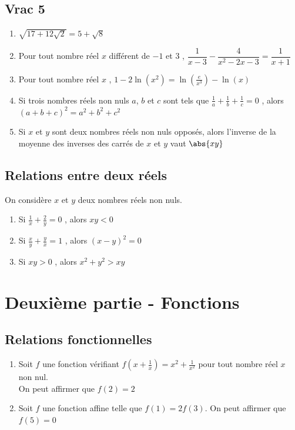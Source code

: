 \documentclass[oneside,12pt]{article}
\begin{document}
\subsection{Vrac 5}
\begin{enumerate}
	\item $\sqrt{17+12\sqrt{2}}=5+\sqrt{8}$
	\item Pour tout nombre réel $x$ différent de $-1$ et $3$ , $\dfrac{1}{x-3}-\dfrac{4}{x^2-2x-3}=\dfrac{1}{x+1}$
	\item Pour tout nombre réel $x$ , $1-2\ln(x^2)=\ln\left(\frac{e}{x^3}\right)-\ln(x)$
	\item Si trois nombres réels non nuls $a$, $b$ et $c$ sont tels que $\frac{1}{a}+\frac{1}{b}+\frac{1}{c}=0$ , alors  \\$(a+b+c)^2=a^2+b^2+c^2$
	\item Si $x$ et $y$ sont deux nombres réels non nuls opposés, alors l'inverse de la moyenne des inverses des carrés de $x$ et $y$ vaut $\abs{xy}$
\end{enumerate}



\subsection{Relations entre deux réels}
On considère $x$ et $y$ deux nombres réels non nuls.
\begin{enumerate}
    \item Si $\frac{1}{x}+\frac{2}{y}=0$ , alors $xy<0$
    \item Si $\frac{x}{y}+\frac{y}{x}=1$ , alors $(x-y)^2=0$
    \item Si $xy>0$ , alors $x^2+y^2>xy$
\end{enumerate}

	

\section*{Deuxième partie - Fonctions}

\subsection{Relations fonctionnelles}
\begin{enumerate}
	\item Soit $f$ une fonction vérifiant $f\left(x+\frac{1}{x}\right)=x^2+\frac{1}{x^2}$ pour tout nombre réel $x$ non nul.\\
	On peut affirmer que $f(2)=2$
	\item Soit $f$ une fonction affine telle que $f(1)=2f(3)$. On peut affirmer que $f(5)=0$
\end{enumerate}
\end{document}
